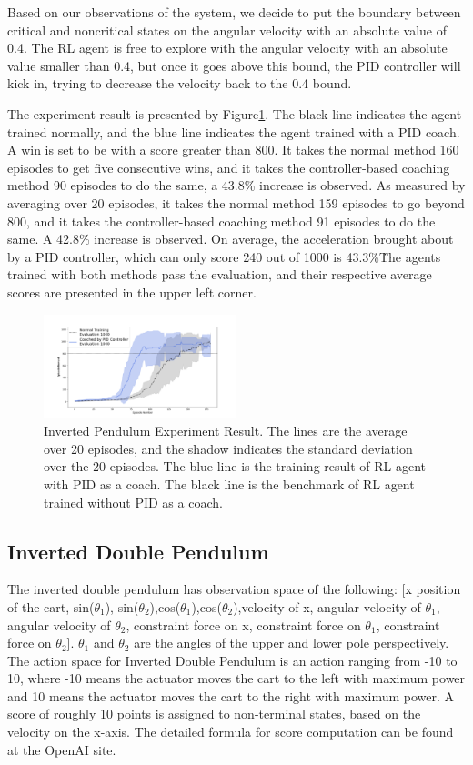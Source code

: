 \documentclass[journal]{IEEEtran}
\begin{document}
Based on our observations of the system, we decide to put the boundary between critical and noncritical states on the angular velocity with an absolute value of 0.4. The RL agent is free to explore with the angular velocity with an absolute value smaller than 0.4, but once it goes above this bound, the PID controller will kick in, trying to decrease the velocity back to the 0.4 bound.

The experiment result is presented by Figure\ref{fig:ip_result}. The black line indicates the agent trained normally, and the blue line indicates the agent trained with a PID coach. A win is set to be with a score greater than 800. It takes the normal method 160 episodes to get five consecutive wins, and it takes the controller-based coaching method 90 episodes to do the same, a 43.8\% increase is observed. As measured by averaging over 20 episodes, it takes the normal method 159 episodes to go beyond 800, and it takes the controller-based coaching method 91 episodes to do the same. A 42.8\% increase is observed. On average, the acceleration brought about by a PID controller, which can only score 240 out of 1000 is 43.3\%\. The agents trained with both methods pass the evaluation, and their respective average scores are presented in the upper left corner.

\begin{figure}[H]
     \centering
      \includegraphics[width=0.5\textwidth]{ip.png}
      \caption{Inverted Pendulum Experiment Result. The lines are the average over 20 episodes, and the shadow indicates the standard deviation over the 20 episodes. The blue line is the training result of RL agent with PID as a coach. The black line is the benchmark of RL agent trained without PID as a coach. }
      \label{fig:ip_result}

\end{figure}

\subsection{Inverted Double Pendulum}
The inverted double pendulum has observation space of the following: [x position of the cart, sin($\theta_1$), sin($\theta_2$),cos($\theta_1$),cos($\theta_2$),velocity of x, angular velocity of $\theta_1$, angular velocity of $\theta_2$, constraint force on x, constraint force on $\theta_1$, constraint force on $\theta_2$]. $\theta_1$ and $\theta_2$ are the angles of the upper and lower pole perspectively. The action space for Inverted Double Pendulum is an action ranging from -10 to 10, where -10 means the actuator moves the cart to the left with maximum power and 10 means the actuator moves the cart to the right with maximum power. A score of roughly 10 points is assigned to non-terminal states, based on the velocity on the x-axis. The detailed formula for score computation can be found at the OpenAI site.
\end{document}
